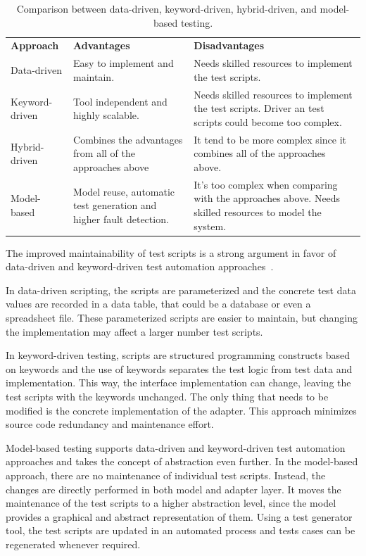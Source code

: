 \begin{table}[!ht]
\centering
\begin{tabular}{l|p{55mm}|p{55mm}}
\textbf{Approach} & \textbf{Advantages} & \textbf{Disadvantages} \\
Data-driven
  & Easy to implement and maintain.
  & Needs skilled resources to implement the test scripts. \\
Keyword-driven
  & Tool independent and highly scalable.
  & Needs skilled resources to implement the test scripts.
    Driver an test scripts could become too complex. \\
\hline
Hybrid-driven
  & Combines the advantages \newline from all of the approaches above
  & It tend to be more complex since \newline it combines all of the approaches above.\\
\hline
Model-based
  & Model reuse, automatic test generation and higher fault detection.
  & It's too complex when comparing with the approaches above.
    Needs skilled resources to model the system. \\
\end{tabular}
\caption{Comparison between data-driven, keyword-driven, hybrid-driven, and
  model-based testing.}
\label{table:comparison-between-approaches}
\end{table}

The improved maintainability of test scripts is a strong argument in favor of
data-driven and keyword-driven test automation approaches~\cite{Kramer2016}.

In data-driven scripting, the scripts are parameterized and the concrete test
data values are recorded in a data table, that could be a database or even a
spreadsheet file. These parameterized scripts are easier to maintain, but
changing the implementation may affect a larger number test scripts.

In keyword-driven testing, scripts are structured programming constructs
based on keywords and the use of keywords separates the test logic from test
data and implementation. This way, the interface implementation can change,
leaving the test scripts with the keywords unchanged. The only thing that needs
to be modified is the concrete implementation of the adapter. This approach
minimizes source code redundancy and maintenance effort.

Model-based testing supports data-driven and keyword-driven test automation
approaches and takes the concept of abstraction even further. In the model-based
approach, there are no maintenance of individual test scripts. Instead, the
changes are directly performed in both model and adapter layer. It moves the
maintenance of the test scripts to a higher abstraction level, since the model
provides a graphical and abstract representation of them. Using a test generator
tool, the test scripts are updated in an automated process and tests cases can
be regenerated whenever required.

